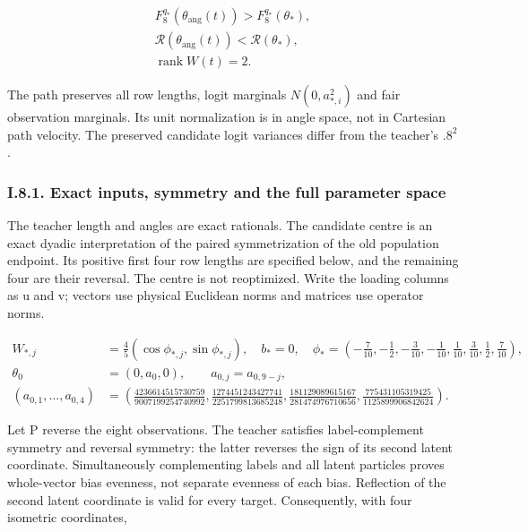 \documentclass{article}
\begin{document}
\[
\begin{gathered}
F_8^{q_*}(\theta_{\mathrm{ang}}(t))>F_8^{q_*}(\theta_*),\\
\mathcal R(\theta_{\mathrm{ang}}(t))<\mathcal R(\theta_*),\\
\operatorname{rank}W(t)=2.
\end{gathered}
\]

The path preserves all row lengths, logit marginals \(N(0,a_{*,i}^2)\)
and fair observation marginals. Its unit normalization is in angle
space, not in Cartesian path velocity. The preserved candidate logit
variances differ from the teacher's \(.8^2\).

\subsubsection*{I.8.1. Exact inputs, symmetry and the full parameter
space}\label{i.8.1.-exact-inputs-symmetry-and-the-full-parameter-space}

The teacher length and angles are exact rationals. The candidate centre
is an exact dyadic interpretation of the paired symmetrization of the
old population endpoint. Its positive first four row lengths are
specified below, and the remaining four are their reversal. The centre
is not reoptimized. Write the loading columns as u and v; vectors use
physical Euclidean norms and matrices use operator norms.

\[
\begin{aligned}
W_{*,j}&=\tfrac45(\cos\phi_{*,j},\sin\phi_{*,j}),\quad b_*=0,\quad
\phi_*=(-\tfrac7{10},-\tfrac12,-\tfrac3{10},-\tfrac1{10},\tfrac1{10},\tfrac3{10},\tfrac12,\tfrac7{10}),\\
\theta_0&=(0,a_0,0),\qquad a_{0,j}=a_{0,9-j},\\
(a_{0,1},\ldots,a_{0,4})&=
\left(\frac{4236614515730759}{9007199254740992},
\frac{1274451243427741}{2251799813685248},
\frac{181129089615167}{281474976710656},
\frac{775431105319425}{1125899906842624}\right).
\end{aligned}
\tag{I.21}
\]

Let P reverse the eight observations. The teacher satisfies
label-complement symmetry and reversal symmetry: the latter reverses the
sign of its second latent coordinate. Simultaneously complementing
labels and all latent particles proves whole-vector bias evenness, not
separate evenness of each bias. Reflection of the second latent
coordinate is valid for every target. Consequently, with four isometric
coordinates,
\end{document}
